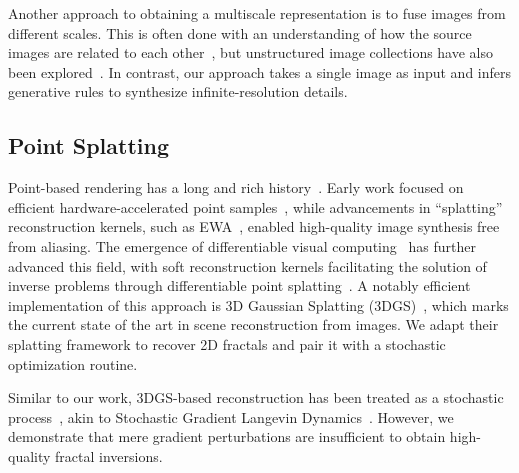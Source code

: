 Another approach to obtaining a multiscale representation is to fuse images from different scales. 
This is often done with an understanding of how the source images are related to each other~\cite{klashed2010uniview, halladjian2019scale, mohammed2017abstractocyte, tao2019kyrix, licorish2021adaptive}, but unstructured image collections have also been explored~\cite{wolski2024scalespacegan}.
In contrast, our approach takes a single image as input and infers generative rules to synthesize infinite-resolution details.




\subsection{Point Splatting}
\label{sec:point_splatting}

Point-based rendering has a long and rich history~\cite{gross2011point}. 
Early work focused on efficient hardware-accelerated point samples~\cite{grossman1998point}, while advancements in ``splatting'' reconstruction kernels, such as EWA~\cite{zwicker2001surface}, enabled high-quality image synthesis free from aliasing. 
The emergence of differentiable visual computing~\cite{li2019differentiable,spielberg2023differentiable} has further advanced this field, with soft reconstruction kernels facilitating the solution of inverse problems through differentiable point splatting~\cite{wiles2020synsin, yifan2019differentiable, lassner2021pulsar}. 
A notably efficient implementation of this approach is 3D Gaussian Splatting (3DGS)~\cite{kerbl20233d}, which marks the current state of the art in scene reconstruction from images. 
We adapt their splatting framework to recover 2D fractals and pair it with a stochastic optimization routine.

Similar to our work, 3DGS-based reconstruction has been treated as a stochastic process~\cite{kheradmand20243d}, akin to Stochastic Gradient Langevin Dynamics~\cite{brosse2018promises}. 
However, we demonstrate that mere gradient perturbations are insufficient to obtain high-quality fractal inversions.


